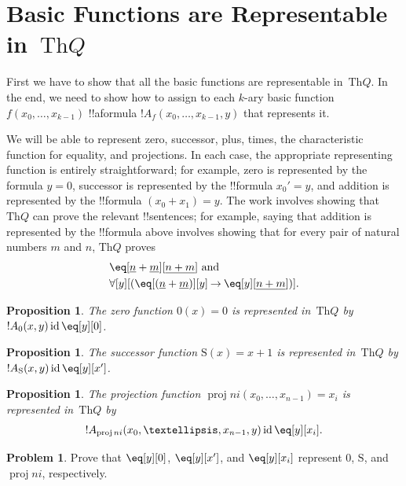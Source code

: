 \documentclass[10pt,a4paper]{article}
\theoremstyle{plain}
\newtheorem{prop}[thm]{Proposition}
\theoremstyle{definition}
\newtheorem{prob}{Problem}[section]
\theoremstyle{remark}
\newcommand*{\olfileid}[3]{}
\newcommand*{\olsection}[1]{\section*{#1}}
\newcommand*{\ollabel}[1]{\label{#1}}
\providecommand{\lif}{\mathbin{\rightarrow}}
\providecommand{\lforall}{\mathord{\forall}}
\providecommand{\Obj}{}
\providecommand{\Th}{\ensuremath{\mathrm{Th}}}
\providecommand{\num}[1]{\underline{#1}}
\providecommand{\Zero}{\ensuremath{0}}
\providecommand{\Succ}{\ensuremath{\mathrm{S}}}
\providecommand{\Proj}{\operatorname{proj}}
\providecommand{\ident}{\operatorname{id}}
\begin{document}



\olfileid{inc}{req}{bre}
\olsection{Basic Functions are Representable in~$\Th{Q}$}

First we have to show that all the basic functions are representable
in~$\Th{Q}$. In the end, we need to show how to assign to each $k$-ary
basic function $f(x_0,\dots,x_{k-1})$ !!a{formula}
$!A_f(x_0,\dots,x_{k-1},y)$ that represents it.

We will be able to represent zero, successor, plus, times, the
characteristic function for equality, and projections. In each case,
the appropriate representing function is entirely straightforward; for
example, zero is represented by the formula $y = \Obj 0$, successor is
represented by the !!{formula} $x_0' = y$, and addition is represented
by the !!{formula} $(x_0 + x_1) = y$. The work involves showing that
$\Th{Q}$ can prove the relevant !!{sentence}s; for example, saying
that addition is represented by the !!{formula} above involves showing
that for every pair of natural numbers $m$ and $n$, $\Th{Q}$ proves
\begin{align*}
& \eq[\num n + \num m][\num {n+m}] \text{ and}\\
& \lforall[y][(\eq[(\num n + \num m)][y] \lif \eq[y][\num{n+m}])].
\end{align*}

\begin{prop}
\ollabel{prop:rep-zero}
The zero function $\Zero(x) = 0$ is represented in~$\Th{Q}$ by
$!A_{\Zero}(x,y) \ident \eq[y][\Obj 0]$.
\end{prop}

\begin{prop}
\ollabel{prop:rep-succ}
The successor function $\Succ(x) = x+1$ is represented in~$\Th{Q}$ by
$!A_{\Succ}(x,y) \ident \eq[y][x']$.  
\end{prop}

\begin{prop}
\ollabel{prop:rep-proj}
The projection function $\Proj{n}{i}(x_0, \dots, x_{n-1}) = x_i$ is
represented in~$\Th{Q}$ by \[!A_{\Proj{n}{i}}(x_0, \dots, x_{n-1}, y) \ident \eq[y][x_i].\]
\end{prop}

\begin{prob}
Prove that $\eq[y][\Obj 0]$, $\eq[y][x']$, and $\eq[y][x_i]$ represent
$\Zero$, $\Succ$, and $\Proj{n}{i}$, respectively.
\end{prob}
\end{document}
